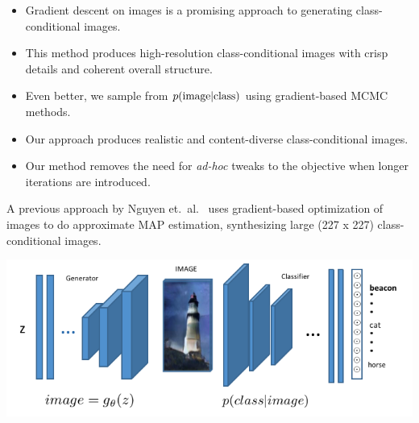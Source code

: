 \documentclass[landscape,a0b,final,a4resizeable]{include/a0poster}
\begin{document}
\begin{poster}
\begin{multicols}{3}
% 
%
% 
\vspace{0.2in}
% 
\begin{itemize}
	\item Gradient descent on images is a promising approach to generating class-conditional images.
	\item This method produces high-resolution class-conditional images with crisp details and coherent overall structure.
	\item Even better, we sample from $p(\textnormal{image} | \textnormal{class})$ using gradient-based MCMC methods.
	\item Our approach produces realistic and content-diverse class-conditional images.
	\item Our method removes the need for \emph{ad-hoc} tweaks to the objective when longer iterations are introduced.
\end{itemize}

\vspace{0.5in}

% 
A previous approach by Nguyen et.\ al.\ \cite{Nguyen2016} uses gradient-based optimization of images to do approximate 
 MAP estimation, synthesizing large (227 x 227) class-conditional images.\\

\begin{center} 
  \centering
  \includegraphics{figures/img}
  \label{fig:net}
\end{center}


\end{multicols}
\end{poster}
\end{document}

